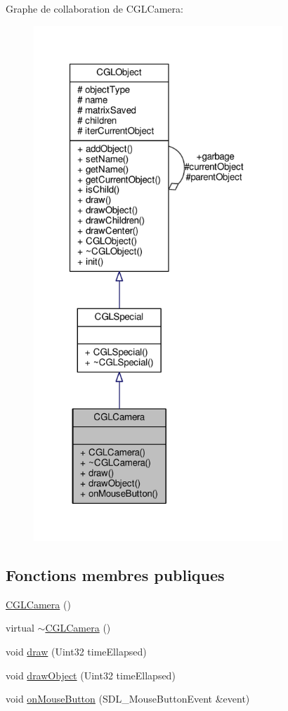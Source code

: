 Graphe de collaboration de C\-G\-L\-Camera\-:\nopagebreak
\begin{figure}[H]
\begin{center}
\leavevmode
\includegraphics[height=550pt]{d0/d98/class_c_g_l_camera__coll__graph}
\end{center}
\end{figure}
\subsection*{Fonctions membres publiques}
\begin{DoxyCompactItemize}
\item 
\hyperlink{class_c_g_l_camera_a5d3aca0bd9e9f3c7aa1a93474ff63199}{C\-G\-L\-Camera} ()
\item 
virtual \hyperlink{class_c_g_l_camera_adc9a9432202a4f4e3b83bff97c5e4690}{$\sim$\-C\-G\-L\-Camera} ()
\item 
void \hyperlink{class_c_g_l_camera_aba86bb34d99b382e044a52291a3ad435}{draw} (Uint32 time\-Ellapsed)
\item 
void \hyperlink{class_c_g_l_camera_a804d27abd87be682a5b508fe5f0a4451}{draw\-Object} (Uint32 time\-Ellapsed)
\item 
void \hyperlink{class_c_g_l_camera_ad0f4898351c8df558a627102f233ded8}{on\-Mouse\-Button} (S\-D\-L\-\_\-\-Mouse\-Button\-Event \&event)
\end{DoxyCompactItemize}

